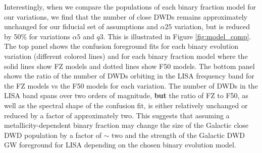 \documentclass[twocolumn, linenumbers]{aastex631}
\begin{document}
Interestingly, when we compare the populations of each binary fraction model for our variations, we find that the number of close DWDs remains approximately unchanged for our fiducial set of assumptions and $\alpha25$ variation, but is reduced by 50\% for variations $\alpha5$ and $q3$. This is illustrated in Figure \ref{fig:model_comp}. The top panel shows the confusion foreground fits for each binary evolution variation (different colored lines) and for each binary fraction model where the solid lines show FZ models and dotted lines show F50 models. The bottom panel shows the ratio of the number of DWDs orbiting in the LISA frequency band for the FZ models vs the F50 models for each variation. The number of DWDs in the LISA band spans over two orders of magnitude, \textbf{but} the ratio of FZ to F50, as well as the spectral shape of the confusion fit, is either relatively unchanged or reduced by a factor of approximately two. This suggests that assuming a metallicity-dependent binary fraction may change the size of the Galactic close DWD population by a factor of $\sim$ two and the strength of the Galactic DWD GW foreground for LISA depending on the chosen binary evolution model.
\end{document}
